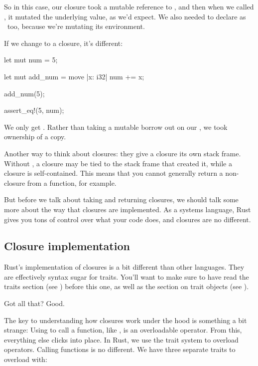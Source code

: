 So in this case, our closure took a mutable reference to , and then when we called , it mutated the underlying 
value, as we'd expect. We also needed to declare  as \mut\ too, because we're mutating its environment.

\blank

If we change to a  closure, it's different:

\begin{rustc}
let mut num = 5;

{
    let mut add_num = move |x: i32| num += x;

    add_num(5);
}

assert_eq!(5, num);
\end{rustc}

We only get . Rather than taking a mutable borrow out on our , we took ownership of a copy.

\blank

Another way to think about  closures: they give a closure its own stack frame. Without , a closure may be tied 
to the stack frame that created it, while a  closure is self-contained. This means that you cannot generally return a non- 
closure from a function, for example.

\blank

But before we talk about taking and returning closures, we should talk some more about the way that closures are implemented. As a systems 
language, Rust gives you tons of control over what your code does, and closures are no different.

\subsection*{Closure implementation}

Rust's implementation of closures is a bit different than other languages. They are effectively syntax sugar for traits. You'll want to 
make sure to have read the traits section (see ) before this one, as well as the section on 
trait objects (see ).

\blank

Got all that? Good.

\blank

The key to understanding how closures work under the hood is something a bit strange: Using \code{()} to call a function, like , 
is an overloadable operator. From this, everything else clicks into place. In Rust, we use the trait system to overload operators. Calling 
functions is no different. We have three separate traits to overload with:


